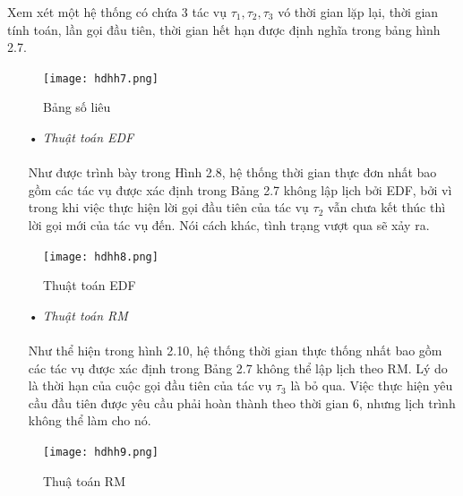 \documentclass[a4paper,10pt]{report}
\begin{document}
Xem xét một hệ thống có chứa 3 tác vụ $\tau_1, \tau_2, \tau_3$ vó thời gian lặp lại, thời gian tính toán, lần gọi đầu tiên, thời gian hết hạn được định nghĩa trong bảng hình 2.7.
\newpage
\begin{figure}[h]
\begin{center}
\texttt{[image: hdhh7.png]}
\caption{Bảng số liêu}
\end{center}
\end{figure}
\begin{itemize}
\item[•] \textit{Thuật toán EDF} \\ \\ 
Như được trình bày trong Hình 2.8, hệ thống thời gian thực đơn nhất bao gồm các tác vụ được xác định trong Bảng 2.7 không lập lịch bởi EDF, bởi vì trong khi việc thực hiện lời gọi đầu tiên của tác vụ $\tau_2$ vẫn chưa kết thúc thì lời gọi mới của tác vụ đến. Nói cách khác, tình trạng vượt qua sẽ xảy ra.
\end{itemize}
\begin{figure}[h]
\begin{center}
\texttt{[image: hdhh8.png]}
\caption{Thuật toán EDF}
\end{center}
\end{figure}
\begin{itemize}
\item[•] \textit{Thuật toán RM} \\ \\
Như thể hiện trong hình 2.10, hệ thống thời gian thực thống nhất bao gồm các tác vụ được xác định trong Bảng 2.7 không thể lập lịch theo RM. Lý do là thời hạn của cuộc gọi đầu tiên của tác vụ $\tau_3$ là bỏ qua. Việc thực hiện yêu cầu đầu tiên được yêu cầu phải hoàn thành theo thời gian 6, nhưng lịch trình không thể làm cho nó.
\end{itemize}
\begin{figure}[h]
\begin{center}
\texttt{[image: hdhh9.png]}
\caption{Thuậ toán RM}
\end{center}
\end{figure}
\newpage
\end{document}
